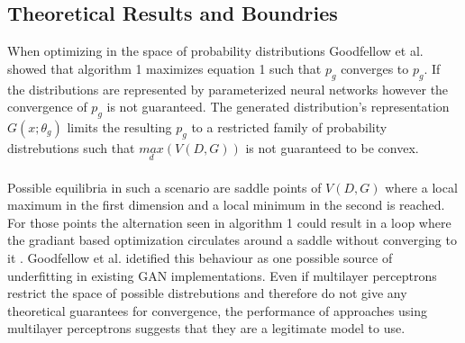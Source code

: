   \subsection{Theoretical Results and Boundries}

  When optimizing in the space of probability distributions Goodfellow et al. \cite{1} showed that algorithm 1 maximizes equation 1 such that \( p_g \) converges to \( p_g \).
  If the distributions are represented by parameterized neural networks however the convergence of \( p_g \) is not guaranteed.
  The generated distribution's representation \( G(x; \theta _g) \) limits the resulting \( p_g \) to a restricted family of probability distrebutions such that \( \underset{d}{max}( V(D,G) ) \) is not guaranteed to be convex.
  \\
  \\
  Possible equilibria in such a scenario are saddle points of \( V(D,G) \) where a local maximum in the first dimension and a local minimum in the second is reached.
  For those points the alternation seen in algorithm 1 could result in a loop where the gradiant based optimization circulates around a saddle without converging to it \cite{2}.
  Goodfellow et al. \cite{3} idetified this behaviour as one possible source of underfitting in existing GAN implementations.
  Even if multilayer perceptrons restrict the space of possible distrebutions and therefore do not give any theoretical guarantees for convergence, the performance of approaches using multilayer perceptrons suggests that they are a legitimate model to use. \cite{1}
